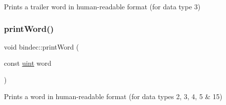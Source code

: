 Prints a trailer word in human-\/readable format (for data type 3) 

\mbox{\label{namespacebindec_ac6d286aca6c2fa2fa29938e4d8247cfa}} 
\subsubsection{\texorpdfstring{print\+Word()}{printWord()}}
{\footnotesize\ttfamily void bindec\+::print\+Word (\begin{DoxyParamCaption}\item[{const \hyperlink{namespacebindec_a61700e6ffcfc677215bfdf223803e735}{uint}}]{word }\end{DoxyParamCaption})\hspace{0.3cm}{\ttfamily [inline]}}



Prints a word in human-\/readable format (for data types 2, 3, 4, 5 \& 15) 

